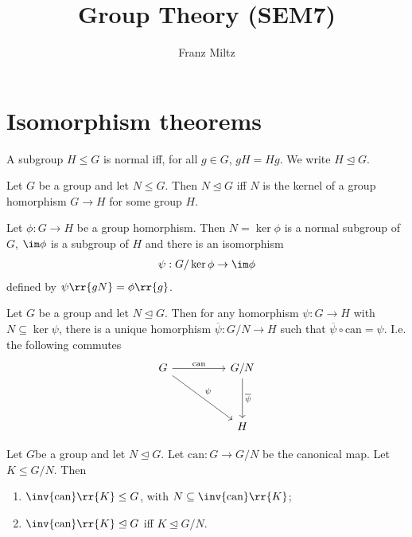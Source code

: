 \documentclass{article}
\begin{document}
\mkthmstwounified
\title{Group Theory (SEM7)}
\author{Franz Miltz}
\maketitle
\tableofcontents
\pagebreak

\section{Isomorphism theorems}
\label{sec:isomorphism-theorems}

\begin{definition}
  \label{def:normal-subgroup}
  A subgroup $H\leq G$ is normal iff, for all $g\in G$, $gH=Hg$. We write $H\trianglelefteq G$.
\end{definition}

\begin{theorem}
  Let $G$ be a group and let $N\leq G$. Then $N\trianglelefteq G$ iff $N$ is the kernel
  of a group homorphism $G\to H$ for some group $H$.
\end{theorem}

\begin{theorem}
  \label{thm:first-iso-theorem}
  Let $\phi:G\to H$ be a group homorphism. Then $N=\ker\phi$ is a normal subgroup of
  $G$, $\im\phi$ is a subgroup of $H$ and there is an isomorphism
  \begin{align*}
    \psi : G/\ker\phi \to \im\phi
  \end{align*}
  defined by $\psi\rr{gN}=\phi\rr{g}$.
\end{theorem}

\begin{theorem}
  \label{thm:up-factor-groups}
  Let $G$ be a group and let $N\trianglelefteq G$. Then for any homorphism $\psi:G\to H$
  with $N\subseteq\ker\psi$, there is a unique homorphism $\overline\psi:G/N\to H$ such
  that $\overline\psi\circ\text{can}=\psi$. I.e. the following commutes
  \begin{equation}
    \begin{tikzcd}[row sep=huge, column sep=huge]
      G \arrow{r}{\text{can}} \arrow{dr}{\psi} & G/N \arrow{d}{\overline\psi} \\
                                               & H
    \end{tikzcd}
  \end{equation}
\end{theorem}

\begin{proposition}
  Let $G$be a group and let $N\trianglelefteq G$. Let $\text{can}:G\to G/N$ be the canonical
  map. Let $K\leq G/N$. Then
  \begin{enumerate}
    \item $\inv{\text{can}}\rr{K}\leq G$, with $N\subseteq\inv{\text{can}}\rr{K}$;
    \item $\inv{\text{can}}\rr{K}\trianglelefteq G$ iff $K\trianglelefteq G/N$.
  \end{enumerate}
\end{proposition}
\end{document}
